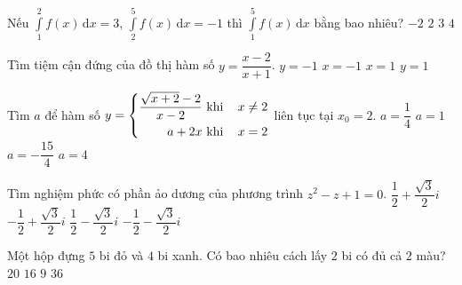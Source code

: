  \begin{ex}%
	Nếu $\displaystyle\int\limits_1^2 f(x)\mathrm{\,d}x = 3$, $\displaystyle\int\limits_2^5 f(x)\mathrm{\,d}x = -1$ thì $\displaystyle\int\limits_1^5 f(x)\mathrm{\,d}x$ bằng bao nhiêu?
	\choice
	{$-2$}
	{\True $2$}
	{$3$}
	{$4$}
\end{ex}

\begin{ex}%
	Tìm tiệm cận đứng của đồ thị hàm số $y=\dfrac{x-2}{x+1}$.
	\choice
	{$y=-1 $}
	{\True $x=-1 $}
	{$x=1 $}
	{$y=1 $}
\end{ex}

\begin{ex}%
	Tìm $a$ để hàm số $y=\left\{\begin{aligned}\dfrac{\sqrt{x+2}-2}{x-2} &\,\,\text{khi}\, &x\neq 2 \\ a+2x &\,\,\text{khi}\, &x= 2\end{aligned}\right.$ liên tục tại $x_0=2$.
	\choice
	{$a=\dfrac{1}{4} $}
	{$a=1 $}
	{\True $a=-\dfrac{15}{4}$}
	{$a=4 $}
\end{ex}

\begin{ex}%
	Tìm nghiệm phức có phần ảo dương của phương trình $z^2-z+1=0$.
	\choice
	{\True $\dfrac{1}{2}+\dfrac{\sqrt{3}}{2}i $}
	{$-\dfrac{1}{2}+\dfrac{\sqrt{3}}{2}i $}
	{$\dfrac{1}{2}-\dfrac{\sqrt{3}}{2}i $}
	{$-\dfrac{1}{2}-\dfrac{\sqrt{3}}{2}i $}
\end{ex}

\begin{ex}%
	Một hộp đựng $5$ bi đỏ và $4$ bi xanh. Có bao nhiêu cách lấy $2$ bi có đủ cả $2$ màu?
	\choice
	{\True  $20 $}
	{$16 $}
	{$9 $}
	{$36 $}
\end{ex}

